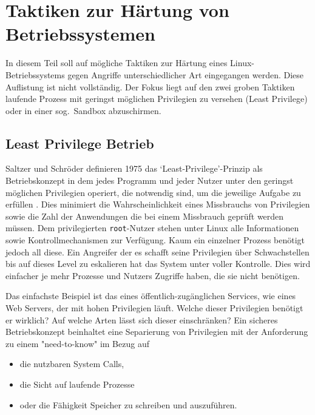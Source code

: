 
\chapter{Taktiken zur Härtung von Betriebssystemen}


In diesem Teil soll auf mögliche Taktiken zur Härtung eines Linux-Betriebssystems gegen Angriffe unterschiedlicher Art eingegangen werden. Diese Auflistung ist nicht vollständig. Der Fokus liegt auf den zwei groben Taktiken laufende Prozess mit geringst möglichen Privilegien zu versehen (\gls{Least Privilege}) oder in einer sog.\ \gls{Sandbox} abzuschirmen.

\section{Least Privilege Betrieb}

Saltzer und Schröder definieren 1975 das `Least-Privilege'-Prinzip als Betriebskonzept in dem jedes Programm und jeder Nutzer unter den geringst möglichen Privilegien operiert, die notwendig sind, um die jeweilige Aufgabe zu erfüllen \cite{saltzer_1975}. Dies minimiert die Wahrscheinlichkeit eines Missbrauchs von Privilegien sowie die Zahl der Anwendungen die bei einem Missbrauch geprüft werden müssen. 
Dem privilegierten \texttt{root}-Nutzer stehen unter Linux alle Informationen sowie Kontrollmechanismen zur Verfügung. Kaum ein einzelner Prozess benötigt jedoch all diese. Ein Angreifer der es schafft seine Privilegien über Schwachstellen bis auf dieses Level zu eskalieren hat das System unter voller Kontrolle. Dies wird einfacher je mehr Prozesse und Nutzers Zugriffe haben, die sie nicht benötigen.

Das einfachste Beispiel ist das eines öffentlich-zugänglichen Services, wie eines Web Servers, der mit hohen Privilegien läuft. Welche dieser Privilegien benötigt er wirklich? Auf welche Arten lässt sich dieser einschränken?
Ein sicheres Betriebskonzept beinhaltet eine Separierung von Privilegien mit der Anforderung zu einem "need-to-know" im Bezug auf 
\begin{itemize}
  \item die nutzbaren System Calls,
  \item die Sicht auf laufende Prozesse
  \item oder die Fähigkeit Speicher zu schreiben und auszuführen.
\end{itemize}

